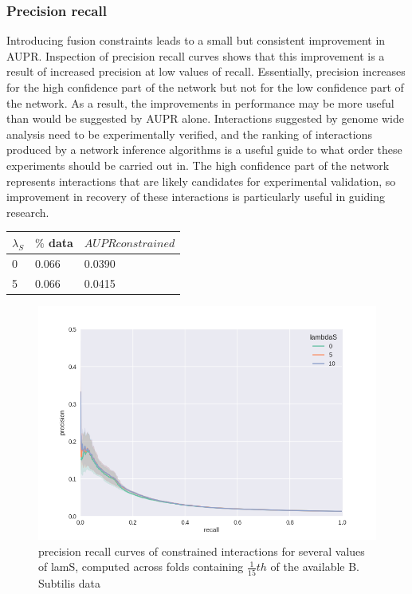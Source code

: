\documentclass[11pt]{article}
\begin{document}
\subsubsection{Precision recall}
Introducing fusion constraints leads to a small but consistent improvement in AUPR. Inspection of precision recall curves shows that this improvement is a result of increased precision at low values of recall. Essentially, precision increases for the high confidence part of the network but not for the low confidence part of the network. As a result, the improvements in performance may be more useful than would be suggested by AUPR alone. Interactions suggested by genome wide analysis need to be experimentally verified, and the ranking of interactions produced by a network inference algorithms is a useful guide to what order these experiments should be carried out in. The high confidence part of the network represents interactions that are likely candidates for experimental validation, so improvement in recovery of these interactions is particularly useful in guiding research. 


\begin{center}
  \begin{tabular}{ l | l | l }
    \hline
    $\lambda_S$ & $\%$ data & $AUPR constrained$ \\ \hline
    0 & 0.066 & 0.0390 \\
    5 & 0.066 & 0.0415 \\
    \hline
  \end{tabular}
\end{center}


\begin{figure}
\begin{center}
  \includegraphics[scale=0.45]{waka7unnormed.png}
  \caption{\label{fig:figure1} precision recall curves of constrained interactions for several values of lamS, computed across folds containing $\frac{1}{15}th$ of the available B. Subtilis data}
  \end{center}
\end{figure}
\end{document}
